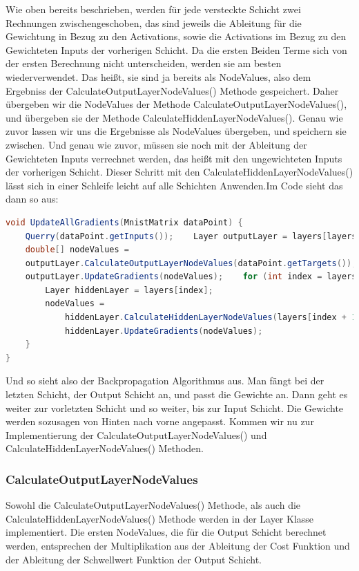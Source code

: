\documentclass[12pt]{article}
\begin{document}
Wie oben bereits beschrieben, werden für jede versteckte Schicht zwei Rechnungen zwischengeschoben, das sind jeweils die Ableitung für die Gewichtung in Bezug zu den Activations, sowie die Activations im Bezug zu den Gewichteten Inputs der vorherigen Schicht. Da die ersten Beiden Terme sich von der ersten Berechnung nicht unterscheiden, werden sie am besten wiederverwendet. Das heißt, sie sind ja bereits als NodeValues, also dem Ergebniss der CalculateOutputLayerNodeValues() Methode gespeichert. Daher übergeben wir die NodeValues der Methode CalculateOutputLayerNodeValues(), und übergeben sie der Methode CalculateHiddenLayerNodeValues(). Genau wie zuvor lassen wir uns die Ergebnisse als NodeValues übergeben, und speichern sie zwischen. Und genau wie zuvor, müssen sie noch mit der Ableitung der Gewichteten Inputs verrechnet werden, das heißt mit den ungewichteten Inputs der vorherigen Schicht.
Dieser Schritt mit den CalculateHiddenLayerNodeValues() lässt sich in einer Schleife leicht auf alle Schichten Anwenden.Im Code sieht das dann so aus:\begin{lstlisting}[language=Java]
void UpdateAllGradients(MnistMatrix dataPoint) {
    Querry(dataPoint.getInputs());    Layer outputLayer = layers[layers.length - 1];
    double[] nodeValues = 
    outputLayer.CalculateOutputLayerNodeValues(dataPoint.getTargets());
    outputLayer.UpdateGradients(nodeValues);    for (int index = layers.length - 2; index >= 0; index--) {
        Layer hiddenLayer = layers[index];
        nodeValues = 
            hiddenLayer.CalculateHiddenLayerNodeValues(layers[index + 1], nodeValues);
            hiddenLayer.UpdateGradients(nodeValues);
    }
}
\end{lstlisting}Und so sieht also der Backpropagation Algorithmus aus. Man fängt bei der letzten Schicht, der Output Schicht an, und passt die Gewichte an. Dann geht es weiter zur vorletzten Schicht und so weiter, bis zur Input Schicht. Die Gewichte werden sozusagen von Hinten nach vorne angepasst.
Kommen wir nu zur Implementierung der CalculateOutputLayerNodeValues() und CalculateHiddenLayerNodeValues() Methoden.\subsubsection{CalculateOutputLayerNodeValues}Sowohl die CalculateOutputLayerNodeValues() Methode, als auch die CalculateHiddenLayerNodeValues() Methode werden in der Layer Klasse implementiert.
Die ersten NodeValues, die für die Output Schicht berechnet werden, entsprechen der Multiplikation aus der Ableitung der Cost Funktion und der Ableitung der Schwellwert Funktion der Output Schicht.
\end{document}
